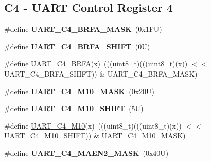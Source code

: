 \subsection*{C4 -\/ U\+A\+RT Control Register 4}
\begin{DoxyCompactItemize}
\item 
\mbox{\label{group___u_a_r_t___register___masks_ga2f0ab4e5358add87747c744f8ba324fb}} 
\#define {\bfseries U\+A\+R\+T\+\_\+\+C4\+\_\+\+B\+R\+F\+A\+\_\+\+M\+A\+SK}~(0x1\+F\+U)
\item 
\mbox{\label{group___u_a_r_t___register___masks_gae8cac47de1cbd8f8bd2cb10133e4f603}} 
\#define {\bfseries U\+A\+R\+T\+\_\+\+C4\+\_\+\+B\+R\+F\+A\+\_\+\+S\+H\+I\+FT}~(0\+U)
\item 
\#define \mbox{\hyperlink{group___u_a_r_t___register___masks_ga6f2c51a18bd4fe60b12fc2e68a18988b}{U\+A\+R\+T\+\_\+\+C4\+\_\+\+B\+R\+FA}}(x)~(((uint8\+\_\+t)(((uint8\+\_\+t)(x)) $<$$<$ U\+A\+R\+T\+\_\+\+C4\+\_\+\+B\+R\+F\+A\+\_\+\+S\+H\+I\+FT)) \& U\+A\+R\+T\+\_\+\+C4\+\_\+\+B\+R\+F\+A\+\_\+\+M\+A\+SK)
\item 
\mbox{\label{group___u_a_r_t___register___masks_ga9e9d5093d6aec7bd4c3f418ee54f8801}} 
\#define {\bfseries U\+A\+R\+T\+\_\+\+C4\+\_\+\+M10\+\_\+\+M\+A\+SK}~(0x20\+U)
\item 
\mbox{\label{group___u_a_r_t___register___masks_gafd4cf70aa0988a96e3744eae7a0f036d}} 
\#define {\bfseries U\+A\+R\+T\+\_\+\+C4\+\_\+\+M10\+\_\+\+S\+H\+I\+FT}~(5\+U)
\item 
\#define \mbox{\hyperlink{group___u_a_r_t___register___masks_ga7cf6f5b1c9f67f2caf54ed725b3ba92e}{U\+A\+R\+T\+\_\+\+C4\+\_\+\+M10}}(x)~(((uint8\+\_\+t)(((uint8\+\_\+t)(x)) $<$$<$ U\+A\+R\+T\+\_\+\+C4\+\_\+\+M10\+\_\+\+S\+H\+I\+FT)) \& U\+A\+R\+T\+\_\+\+C4\+\_\+\+M10\+\_\+\+M\+A\+SK)
\item 
\mbox{\label{group___u_a_r_t___register___masks_gac1c8fa0730a887b5d4d43f426b27c955}} 
\#define {\bfseries U\+A\+R\+T\+\_\+\+C4\+\_\+\+M\+A\+E\+N2\+\_\+\+M\+A\+SK}~(0x40\+U)
\item 
\mbox{\label{group___u_a_r_t___register___masks_ga5ec71022d0264fefd4c63118d90adbb2}} 

\end{DoxyCompactItemize}
